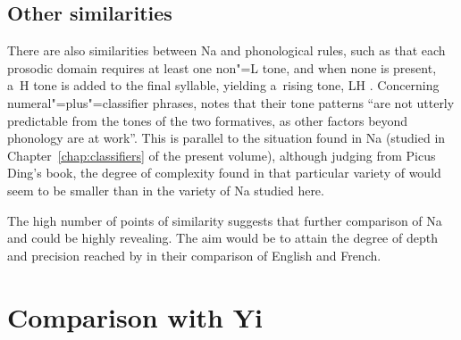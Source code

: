 \subsection{Other similarities}
\label{sec:othersimilarities}

There are also similarities between Na and  phonological rules, such as that each prosodic domain requires at least one non"=L tone, and when none is present, a~H tone is added to the final syllable, yielding a~rising tone, LH \citep[60]{ding2014}. Concerning numeral"=plus"=classifier phrases, \citet[69]{ding2014} notes that their tone patterns “are not utterly predictable from the tones of the two formatives, as other factors beyond phonology are at work”. This is parallel to the situation found in Na (studied in Chapter~\ref{chap:classifiers} of the present volume), although judging from Picus Ding's book, the degree of complexity found in that particular variety of  would seem to be smaller than in the variety of Na studied here. 

The high number of points of similarity suggests that further comparison of Na and  could be highly revealing. The aim would be to attain the degree of depth and precision reached by \citet{wagneretal2010} in their comparison of {English} and French. 



%

\section{Comparison with Yi}
\label{sec:compwithyi}

